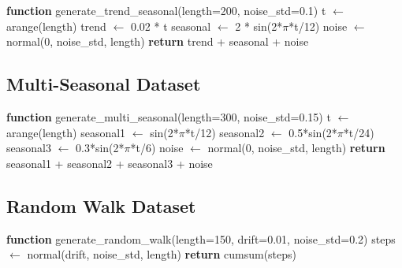 \documentclass[11pt]{article}
\begin{document}
\begin{algorithmic}
\STATE \textbf{function} generate\_trend\_seasonal(length=200, noise\_std=0.1)
\STATE \quad t $\leftarrow$ arange(length)
\STATE \quad trend $\leftarrow$ 0.02 * t 
\STATE \quad seasonal $\leftarrow$ 2 * sin(2*$\pi$*t/12) 
\STATE \quad noise $\leftarrow$ normal(0, noise\_std, length)
\STATE \quad \textbf{return} trend + seasonal + noise
\end{algorithmic}

\subsection{Multi-Seasonal Dataset}

\begin{algorithmic}
\STATE \textbf{function} generate\_multi\_seasonal(length=300, noise\_std=0.15)
\STATE \quad t $\leftarrow$ arange(length)
\STATE \quad seasonal1 $\leftarrow$ sin(2*$\pi$*t/12) 
\STATE \quad seasonal2 $\leftarrow$ 0.5*sin(2*$\pi$*t/24) 
\STATE \quad seasonal3 $\leftarrow$ 0.3*sin(2*$\pi$*t/6) 
\STATE \quad noise $\leftarrow$ normal(0, noise\_std, length)
\STATE \quad \textbf{return} seasonal1 + seasonal2 + seasonal3 + noise
\end{algorithmic}

\subsection{Random Walk Dataset}

\begin{algorithmic}
\STATE \textbf{function} generate\_random\_walk(length=150, drift=0.01, noise\_std=0.2)
\STATE \quad steps $\leftarrow$ normal(drift, noise\_std, length)
\STATE \quad \textbf{return} cumsum(steps)
\end{algorithmic}
\end{document}
